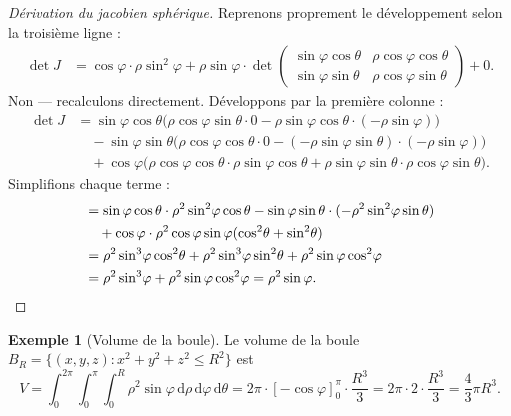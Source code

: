 \documentclass[12pt,a4paper,openany]{book}
\theoremstyle{definition}
\newtheorem{exemple}{Exemple}[chapter]
\newcommand{\dd}{\mathrm{d}}
\begin{document}
\begin{proof}[Dérivation du jacobien sphérique]
  Reprenons proprement le développement selon la troisième ligne :
  \begin{align*}
    \det J &= \cos\varphi\cdot\rho\sin^2\!\varphi
    +\rho\sin\varphi\cdot\det\begin{pmatrix}
      \sin\varphi\cos\theta & \rho\cos\varphi\cos\theta \\
      \sin\varphi\sin\theta & \rho\cos\varphi\sin\theta
    \end{pmatrix} + 0.
  \end{align*}
  Non --- recalculons directement. Développons par la première colonne :
  \begin{align*}
    \det J &= \sin\varphi\cos\theta\bigl(\rho\cos\varphi\sin\theta\cdot
    0 - \rho\sin\varphi\cos\theta\cdot(-\rho\sin\varphi)\bigr) \\
    &\quad -\sin\varphi\sin\theta\bigl(\rho\cos\varphi\cos\theta\cdot
    0 - (-\rho\sin\varphi\sin\theta)\cdot(-\rho\sin\varphi)\bigr) \\
    &\quad + \cos\varphi\bigl(\rho\cos\varphi\cos\theta\cdot
    \rho\sin\varphi\cos\theta +
    \rho\sin\varphi\sin\theta\cdot\rho\cos\varphi\sin\theta\bigr).
  \end{align*}
  Simplifions chaque terme :
  \begin{align*}
    &= \sin\varphi\cos\theta\cdot\rho^2\sin^2\!\varphi\cos\theta
    - \sin\varphi\sin\theta\cdot(-\rho^2\sin^2\!\varphi\sin\theta) \\
    &\quad + \cos\varphi\cdot\rho^2\cos\varphi\sin\varphi
    (\cos^2\!\theta + \sin^2\!\theta) \\
    &= \rho^2\sin^3\!\varphi\cos^2\!\theta
    + \rho^2\sin^3\!\varphi\sin^2\!\theta
    + \rho^2\sin\varphi\cos^2\!\varphi \\
    &= \rho^2\sin^3\!\varphi + \rho^2\sin\varphi\cos^2\!\varphi
    = \rho^2\sin\varphi. \qedhere
  \end{align*}
\end{proof}


\begin{exemple}[Volume de la boule]\label{ex:volume-boule}
  Le volume de la boule $B_R = \{(x,y,z) : x^2+y^2+z^2 \leqslant R^2\}$
  est
  \[
    V = \int_0^{2\pi}\!\int_0^\pi\!\int_0^R \rho^2\sin\varphi\,
    \dd\rho\,\dd\varphi\,\dd\theta
    = 2\pi\cdot\left[-\cos\varphi\right]_0^\pi\cdot\frac{R^3}{3}
    = 2\pi\cdot 2\cdot\frac{R^3}{3} = \frac{4}{3}\pi R^3.
  \]
\end{exemple}
\end{document}
